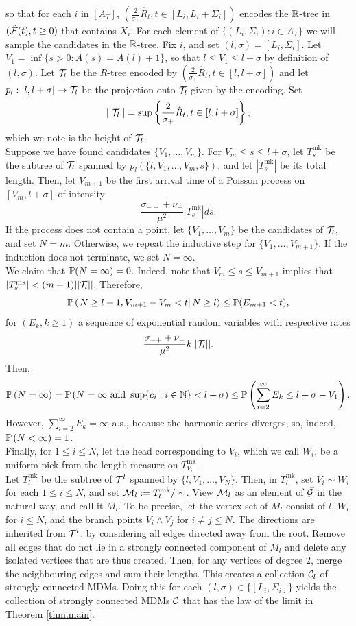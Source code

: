 so that for each $i$ in $\left[A_T\right]$, $\left(\frac{2}{\sigma_+}\hat{R}_t,t\in [L_i,L_i+\Sigma_i]\right)$ encodes the $\R$-tree in $(\hat{\cF}(t),t\geq 0)$ that contains $X_i$. For each element of $\{(L_i,\Sigma_i):i\in A_T\}$ we will sample the candidates in the $\R$-tree. Fix $i$, and set $(l,\sigma)=[L_i,\Sigma_i]$. Let $V_1=\inf\{s>0:A(s)=A(l)+1\}$, so that $l\leq V_1\leq l+\sigma$ by definition of $(l,\sigma)$. Let $\cT_l$ be the $R$-tree encoded by $\left(\frac{2}{\sigma_+}\hat{R}_t,t\in [l,l+\sigma]\right)$ and let $p_l:[l,l+\sigma]\to \cT_l$ be the projection onto $\cT_l$ given by the encoding. Set $$||\cT_l||=\sup\left\{\frac{2}{\sigma_+}\hat{R}_t,t\in [l,l+\sigma]\right\},$$
which we note is the height of $\cT_l$. \\
Suppose we have found candidates $\{V_1,\dots,V_m\}$. For $V_m\leq s\leq l+\sigma$, let $T^{\text{mk}}_s$ be the subtree of $\cT_l$ spanned by $p_l\left(\{l,V_1,\dots,V_m,s\}\right)$, and let $|T^{\text{mk}}_s|$ be its total length. Then, let $V_{m+1}$ be the first arrival time of a Poisson process on $[V_m,l+\sigma]$ of intensity $$\frac{\sigma_{-+}+\nu_-}{\mu^2}|T^{\text{mk}}_s|ds.$$ If the process does not contain a point, let $\{V_1,\dots,V_m\}$ be the candidates of $\cT_l$, and set $N=m$. Otherwise, we repeat the inductive step for $\{V_1,\dots,V_{m+1}\}.$ If the induction does not terminate, we set $N=\infty$.\\
We claim that $\P(N=\infty)=0$. Indeed, note that $V_m\leq s\leq V_{m+1}$ implies that  $|T^{\text{mk}}_s|<(m+1)||\cT_l||$. Therefore, 
$$\P\left(\left.N\geq l+1,V_{m+1}-V_m<t \right|N\geq l\right)\leq \P(E_{m+1}<t),$$
for $(E_{k},k\geq 1)$ a sequence of exponential random variables with respective rates $$\frac{\sigma_{-+}+\nu_-}{\mu^2}k||\cT_l||.$$ 
Then,
$$\P\left(N=\infty \right)=\P\left(N=\infty\text{ and }\sup\{c_i:i\in \N\}<l+\sigma\right)\leq \P\left(\sum_{i=2}^\infty E_k\leq l+\sigma-V_1\right).$$
However, $\sum_{i=2}^\infty E_k=\infty$ a.s., because the harmonic series diverges, so, indeed, $\P\left(N<\infty \right)=1$. \\
Finally, for $1\leq i \leq N$, let the head corresponding to $V_i$, which we call $W_i$, be a uniform pick from the length measure on $T^{\text{mk}}_{V_i}$. \\
Let $T^{\text{mk}}_l$ be the subtree of $\cT^{l}$ spanned by $\{l,V_1,\dots,V_N\}$. Then, in $T^{\text{mk}}_{l}$, set $V_i\sim W_i$ for each $1\leq i\leq N$, and set $\cM_{l}:=T^{\text{mk}}_{l}/\sim$. View $\cM_{l}$ as an element of $\vec{\cG}$ in the natural way, and call it $M_l$. To be precise,  let the vertex set of $M_l$ consist of $l$, $W_i$ for $i\leq N$, and the branch points $V_i\wedge V_j$ for $i\neq j\leq N$. The directions are inherited from $\cT^l$, by considering all edges directed away from the root. Remove all edges that do not lie in a strongly connected component of $M_{l}$ and delete any isolated vertices that are thus created. Then, for any vertices of degree $2$, merge the neighbouring edges and sum their lengths. This creates a collection $\cC_l$ of strongly connected MDMs. Doing this for each $(l,\sigma)\in \{[L_i,\Sigma_i]\}$ yields the collection of strongly connected MDMs $\cC$ that has the law of the limit in Theorem \ref{thm.main}.

